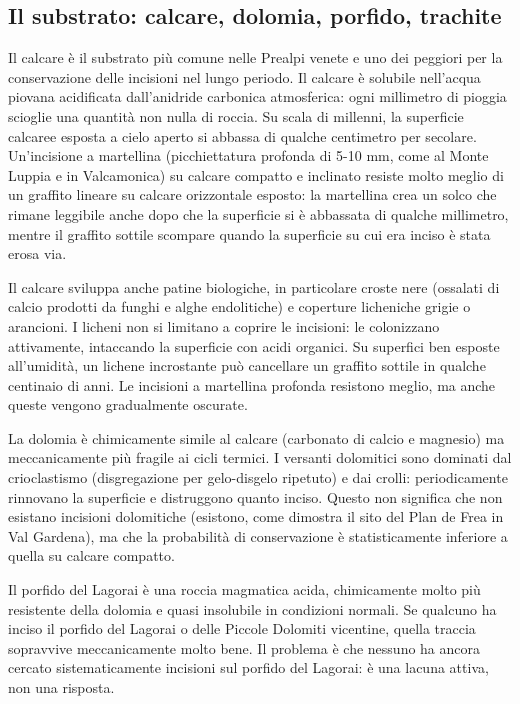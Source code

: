 \subsection{Il substrato: calcare, dolomia, porfido, trachite}

Il calcare è il substrato più comune nelle Prealpi venete e uno dei peggiori per la conservazione delle incisioni nel lungo periodo. Il calcare è solubile nell'acqua piovana acidificata dall'anidride carbonica atmosferica: ogni millimetro di pioggia scioglie una quantità non nulla di roccia. Su scala di millenni, la superficie calcaree esposta a cielo aperto si abbassa di qualche centimetro per secolare. Un'incisione a martellina (picchiettatura profonda di 5-10 mm, come al Monte Luppia e in Valcamonica) su calcare compatto e inclinato resiste molto meglio di un graffito lineare su calcare orizzontale esposto: la martellina crea un solco che rimane leggibile anche dopo che la superficie si è abbassata di qualche millimetro, mentre il graffito sottile scompare quando la superficie su cui era inciso è stata erosa via.

Il calcare sviluppa anche patine biologiche, in particolare croste nere (ossalati di calcio prodotti da funghi e alghe endolitiche) e coperture licheniche grigie o arancioni. I licheni non si limitano a coprire le incisioni: le colonizzano attivamente, intaccando la superficie con acidi organici. Su superfici ben esposte all'umidità, un lichene incrostante può cancellare un graffito sottile in qualche centinaio di anni. Le incisioni a martellina profonda resistono meglio, ma anche queste vengono gradualmente oscurate.

La dolomia è chimicamente simile al calcare (carbonato di calcio e magnesio) ma meccanicamente più fragile ai cicli termici. I versanti dolomitici sono dominati dal crioclastismo (disgregazione per gelo-disgelo ripetuto) e dai crolli: periodicamente rinnovano la superficie e distruggono quanto inciso. Questo non significa che non esistano incisioni dolomitiche (esistono, come dimostra il sito del Plan de Frea in Val Gardena), ma che la probabilità di conservazione è statisticamente inferiore a quella su calcare compatto.

Il porfido del Lagorai è una roccia magmatica acida, chimicamente molto più resistente della dolomia e quasi insolubile in condizioni normali. Se qualcuno ha inciso il porfido del Lagorai o delle Piccole Dolomiti vicentine, quella traccia sopravvive meccanicamente molto bene. Il problema è che nessuno ha ancora cercato sistematicamente incisioni sul porfido del Lagorai: è una lacuna attiva, non una risposta.

